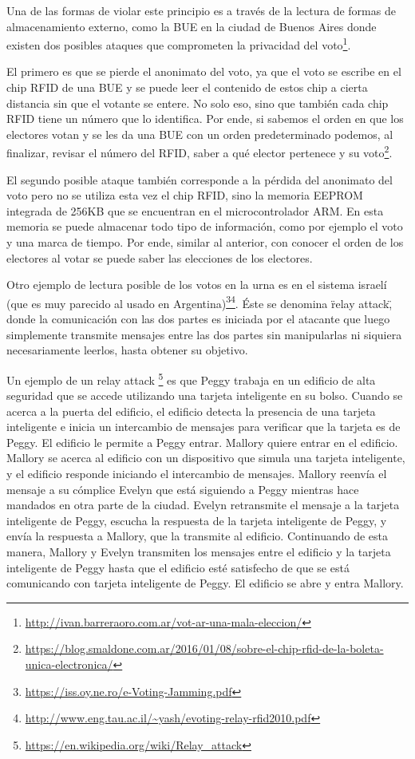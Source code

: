 Una de las formas de violar este principio es a través de la lectura de formas de almacenamiento externo, como la BUE en la ciudad de Buenos Aires donde existen dos posibles ataques que comprometen la privacidad del voto\footnote{\url{http://ivan.barreraoro.com.ar/vot-ar-una-mala-eleccion/}}.

El primero es que se pierde el anonimato del voto, ya que el voto se escribe en el chip RFID de una BUE y se puede leer el contenido de estos chip a cierta distancia sin que el votante se entere. No solo eso, sino que también cada chip RFID tiene un número que lo identifica. Por ende, si sabemos el orden en que los electores votan y se les da una BUE con un orden predeterminado podemos, al finalizar, revisar el número del RFID, saber a qué elector pertenece y su voto\footnote{\url{https://blog.smaldone.com.ar/2016/01/08/sobre-el-chip-rfid-de-la-boleta-unica-electronica/}}.

El segundo posible ataque también corresponde a la pérdida del anonimato del voto pero no se utiliza esta vez el chip RFID, sino la memoria EEPROM integrada de 256KB que se encuentran en el microcontrolador ARM. En esta memoria se puede almacenar todo tipo de información, como por ejemplo el voto y una marca de tiempo. Por ende, similar al anterior, con conocer el orden de los electores al votar se puede saber las elecciones de los electores.

Otro ejemplo de lectura posible de los votos en la urna es en el sistema israelí (que es muy parecido al usado en Argentina)\footnote{\url{https://iss.oy.ne.ro/e-Voting-Jamming.pdf}}\footnote{\url{http://www.eng.tau.ac.il/~yash/evoting-relay-rfid2010.pdf}}. Éste se denomina \"relay attack\", donde la comunicación con las dos partes es iniciada por el atacante que luego simplemente transmite mensajes entre las dos partes sin manipularlas ni siquiera necesariamente leerlos, hasta obtener su objetivo.

Un ejemplo de un relay attack
\footnote{\url{https://en.wikipedia.org/wiki/Relay_attack}}
 es que Peggy trabaja en un edificio de alta seguridad que se accede utilizando una tarjeta inteligente en su bolso. Cuando se acerca a la puerta del edificio, el edificio detecta la presencia de una tarjeta inteligente e inicia un intercambio de mensajes para verificar que la tarjeta es de Peggy. El edificio le permite a Peggy entrar. Mallory quiere entrar en el edificio. Mallory se acerca al edificio con un dispositivo que simula una tarjeta inteligente, y el edificio responde iniciando el intercambio de mensajes. Mallory reenvía el mensaje a su cómplice Evelyn que está siguiendo a Peggy mientras hace mandados en otra parte de la ciudad. Evelyn retransmite el mensaje a la tarjeta inteligente de Peggy, escucha la respuesta de la tarjeta inteligente de Peggy, y envía la respuesta a Mallory, que la transmite al edificio. Continuando de esta manera, Mallory y Evelyn transmiten los mensajes entre el edificio y la tarjeta inteligente de Peggy hasta que el edificio esté satisfecho de que se está comunicando con tarjeta inteligente de Peggy. El edificio se abre y entra Mallory.

